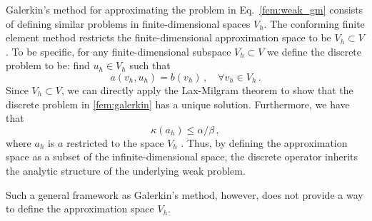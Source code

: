 \documentclass[../doc.tex]{subfiles}
\begin{document}
Galerkin's method for approximating the problem in Eq.~\ref{fem:weak_gm} consists of defining similar problems in finite-dimensional spaces $V_h$. The conforming finite element method restricts the finite-dimensional approximation space to be $V_h \subset V$. To be specific, for any finite-dimensional subspace $V_h\subset V$ we define the discrete problem to be: find $u_h \in V_h$ such that 
	\begin{equation} \label{fem:galerkin}
	 	a(v_h,u_h) = b(v_h) \,, \quad \forall v_h \in V_h \,. 
	\end{equation} 
Since $V_h \subset V$, we can directly apply the Lax-Milgram theorem to show that the discrete problem in \ref{fem:galerkin} has a unique solution. Furthermore, we have that 
	\begin{equation}
		\kappa(a_h) \leq \alpha/\beta \,, 
	\end{equation}
where $a_h$ is $a$ restricted to the space $V_h$ \cite[Corollary 2.4]{la2fa}. Thus, by defining the approximation space as a subset of the infinite-dimensional space, the discrete operator inherits the analytic structure of the underlying weak problem. 


Such a general framework as Galerkin's method, however, does not provide a way to define the approximation space $V_h$. 

\end{document}
